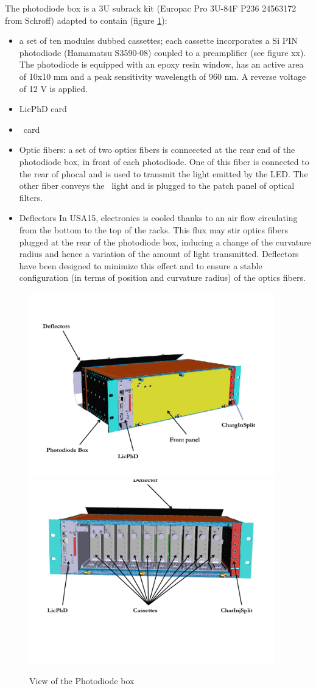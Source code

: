 

The photodiode box is a 3U subrack kit (Europac Pro 3U-84F P236 24563172 from Schroff) adapted to contain (figure \ref{fig:lasphotodiodebox}):
\begin{itemize}
\item a set of ten modules dubbed cassettes; each cassette incorporates a Si PIN photodiode (Hamamatsu S3590-08) coupled to a preamplifier (see figure xx). The photodiode is equipped with an epoxy resin window, has an active area of 10x10 mm and a peak sensitivity wavelength of 960 nm. A reverse voltage of 12 V is applied.
\item LicPhD card
\item \charinjsplit~card
\item Optic fibers: a set of two optics fibers is conncected at the rear end of the photodiode box, in front of each photodiode. One of this fiber is connected to the rear of phocal and is used to transmit the light emitted by the LED. The other fiber conveys the \laser~light and is plugged to the patch panel of optical filters. 
\item Deflectors
In USA15, electronics is cooled thanks to an air flow circulating from the bottom to the top of the racks. This flux may stir optics fibers plugged at the rear of the photodiode box, inducing a change of the curvature radius and hence a variation of the amount of light transmitted. Deflectors have been designed to minimize this effect and to ensure a stable configuration (in terms of position and curvature radius) of the optics fibers.
\end{itemize}


\begin{figure}[htbp]
\centering
\includegraphics[height=8cm]{figures/Photodiodebox.pdf}
\includegraphics[height=8cm]{figures/Photodiodebox2.pdf}
\caption{View of the Photodiode box}\label{fig:lasphotodiodebox}
\end{figure}